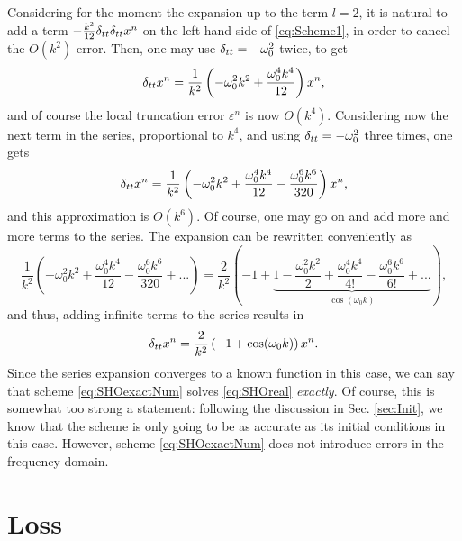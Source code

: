 Considering for the moment the expansion up to the term $l=2$, it is natural to add a term $-\frac{k^2}{12}\delta_{tt} \delta_{tt} x^n$ on the left-hand side of \eqref{eq:Scheme1}, in order to cancel the $O(k^2)$ error. Then, one may use $\delta_{tt} = -\omega_0^2$ twice, to get 
\begin{equation}
    \delta_{tt} x^n = \frac{1}{k^2}\left(-\omega_0^2k^2 + \frac{\omega_0^4 k^4}{12} \right) x^n,
\end{equation}
and of course the local truncation error $\varepsilon^n$ is now $O(k^4)$. Considering now the next term in the series, proportional to $k^4$, and using $\delta_{tt} = -\omega_0^2$ three times, one gets
\begin{equation}
    \delta_{tt} x^n = \frac{1}{k^2}\left(-\omega_0^2k^2 + \frac{\omega_0^4 k^4}{12} - \frac{\omega_0^6k^6}{320}\right) x^n,
\end{equation}
and this approximation is $O(k^6)$. Of course, one may go on and add more and more terms to the series. The expansion can be rewritten conveniently as
\begin{equation}
    \frac{1}{k^2}\left(-\omega_0^2k^2 + \frac{\omega_0^4 k^4}{12} - \frac{\omega_0^6 k^6}{320} + ...\right) = \frac{2}{k^2}\left(-1 + \underbrace{1 - \frac{\omega_0^2k^2}{2} + \frac{\omega_0^4k^4}{4!} - \frac{\omega_0^6k^6}{6!} + ...}_{\cos(\omega_0k)} \right),
\end{equation}
and thus, adding infinite terms to the series results in
\begin{equation}\label{eq:SHOexactNum}
    \delta_{tt} x^n =  \frac{2}{k^2}\left(-1 + \cos(\omega_0 k) \right)x^n.
\end{equation}
Since the series expansion converges to a known function in this case, we can say that scheme \eqref{eq:SHOexactNum} solves \eqref{eq:SHOreal} \emph{exactly}. Of course, this is somewhat too strong a statement: following the discussion in Sec. \ref{sec:Init}, we know that the scheme is only going to be as accurate as its initial conditions in this case. However, scheme \eqref{eq:SHOexactNum} does not introduce errors in the frequency domain. 


\section{Loss}\label{sec:LossSHO}

